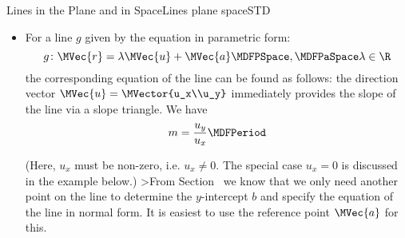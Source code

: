 \begin{MXContent}{Lines in the Plane and in Space}{Lines plane space}{STD}
\begin{MInfo}
\begin{itemize}
$\MVector{x\\m x+b}=x\MVector{1\\m}+\MVector{0\\b}$. Then, the vector form of the equation of a line is
\[
 g\colon \MVec{r}=x\MVector{1\\m}+\MVector{0\\b}\MDFPSpace,\MDFPaSpace x\in\R 
\]
with the direction vector $\MVec{u}=\MVector{1\\m}$ and the reference vector $\MVec{a}=\MVector{0\\b}$.
\item For a line $g$ given by the equation in parametric form:
\[
 g\colon \MVec{r}=\lambda\MVec{u}+\MVec{a}\MDFPSpace,\MDFPaSpace\lambda\in\R
\]
the corresponding equation of the line can be found as follows: the direction vector $\MVec{u}=\MVector{u_x\\u_y}$
immediately provides the slope of the line via a slope triangle. We have
\[
 m=\frac{u_y}{u_x} \MDFPeriod
\]
\begin{center}
\end{center}
(Here, $u_x$ must be non-zero, i.e. $u_x\neq 0$. The special case $u_x=0$ is discussed in the example below.)
>From Section~ we know that we only need another point on the line to 
determine the $y$-intercept $b$ and specify the equation of the line in normal form. It is easiest to use the  
reference point $\MVec{a}$ for this.
\end{itemize}


\end{MInfo}
\end{MXContent}
